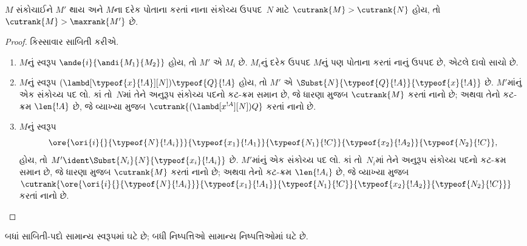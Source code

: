 \begin{lem}
  $M$ સંકોચાઈને $M'$ થાય અને $M$ના દરેક પોતાના કરતાં
  નાના સંકોચ્ય ઉપપદ~$N$ માટે $\cutrank{M} > \cutrank{N}$
  હોય, તો $\cutrank{M} > \maxrank{M'}$ છે.
\end{lem}

\begin{proof}
  કિસ્સાવાર સાબિતી કરીએ.
  \begin{enumerate}
  \item $M$નું સ્વરૂપ $\ande{i}{\andi{M_1}{M_2}}$ હોય,
    તો $M'$ એ $M_i$ છે. $M_i$નું દરેક ઉપપદ
    $M$નું પણ પોતાના કરતાં નાનું ઉપપદ છે,
    એટલે દાવો સાચો છે.
  \item $M$નું સ્વરૂપ
    $(\lambd[\typeof{x}{!A}][N])\typeof{Q}{!A}$ હોય, તો
    $M'$ એ $\Subst{N}{\typeof{Q}{!A}}{\typeof{x}{!A}}$ છે.
    $M'$માંનું એક સંકોચ્ય પદ લો. કાં તો~$N$માં
    તેને અનુરૂપ સંકોચ્ય પદનો કટ-ક્રમ સમાન છે,
    જે ધારણા મુજબ $\cutrank{M}$ કરતાં નાનો છે;
    અથવા તેનો કટ-ક્રમ $\len{!A}$ છે, જે વ્યાખ્યા મુજબ
    $\cutrank{(\lambd[x^{!A}][N])Q}$ કરતાં નાનો છે.
  \item $M$નું સ્વરૂપ
    \[
    \ore{\ori{i}{}{\typeof{N}{!A_i}}}
        {\typeof{x_1}{!A_1}}{\typeof{N_1}{!C}}
        {\typeof{x_2}{!A_2}}{\typeof{N_2}{!C}},
    \]
    હોય, તો $M' \ident \Subst{N_i}{N}{\typeof{x_i}{!A_i}}$ છે.
    $M'$માંનું એક સંકોચ્ય પદ લો. કાં તો~$N_i$માં
    તેને અનુરૂપ સંકોચ્ય પદનો કટ-ક્રમ સમાન છે,
    જે ધારણા મુજબ $\cutrank{M}$ કરતાં નાનો છે;
    અથવા તેનો કટ-ક્રમ $\len{!A_i}$ છે, જે વ્યાખ્યા મુજબ
    $\cutrank{\ore{\ori{i}{}{\typeof{N}{!A_i}}}
      {\typeof{x_1}{!A_1}}{\typeof{N_1}{!C}}
      {\typeof{x_2}{!A_2}}{\typeof{N_2}{!C}}}$ કરતાં નાનો છે.
  \end{enumerate}
\end{proof}

\begin{thm}
  બધાં સાબિતી-પદો સામાન્ય સ્વરૂપમાં ઘટે છે;
  બધી નિષ્પત્તિઓ સામાન્ય નિષ્પત્તિઓમાં ઘટે છે.
\end{thm}

